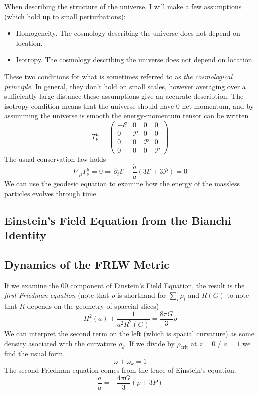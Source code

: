 When describing the structure of the universe, I will make a few assumptions (which hold up to small perturbations):
\begin{itemize}
    \item Homogeneity. The cosmology describing the universe does not depend on location.
    \item Isotropy. The cosmology describing the universe does not depend on location.
\end{itemize}
These two conditions for what is sometimes referred to as \textit{the cosmological principle}. In general, they don't hold on small scales, however averaging over a sufficiently large distance these assumptions give an accurate description. The isotropy condition means that the universe should have 0 net momentum, and by assumming the universe is smooth the energy-momentum tensor can be written
\begin{equation} T^\mu_\nu = \left(
\begin{array}{cccc}
    -\mathcal{E} & 0 & 0 & 0 \\
    0 & \mathcal{P} & 0 & 0 \\
    0 & 0 & \mathcal{P} & 0 \\
    0 & 0 & 0 & \mathcal{P}
\end{array}
\right)
\end{equation}
The usual conservation law holds
\begin{equation}
    \nabla_\mu T^{\mu}_{\nu} = 0 \Rightarrow \partial_t \mathcal{E} + \frac{\dot a}{a}(3\mathcal{E} + 3\mathcal{P}) = 0
\end{equation}
We can use the geodesic equation to examine how the energy of the massless particles evolves through time. 

\subsection{Einstein's Field Equation from the Bianchi Identity}

\subsection{Dynamics of the FRLW Metric}
If we examine the $00$ component of Einstein's Field Equation, the result is the \textit{first Friedman equation} (note that $\rho$ is shorthand for $\sum_i\rho_i$ and $R(G)$ to note that $R$ depends on the geometry of spaceial slices)
\begin{equation}
    H^2(a) + \frac{1}{a^2 R^2(G)} = \frac{8\pi G}{3}\rho
\end{equation}
We can interpret the second term on the left (which is spacial curvature) as some density asociated with the curvature $\rho_k$. If we divide by $\rho_{\text{crit}}$ at $z=0$ / $a=1$ we find the usual form. 
\begin{equation}
    \omega + \omega_k = 1 
\end{equation}
The second Friedman equation comes from the trace of Einstein's equation.
\begin{equation}
    \frac{\ddot a}{a} = -\frac{4\pi G}{3}(\rho + 3P)
\end{equation}

